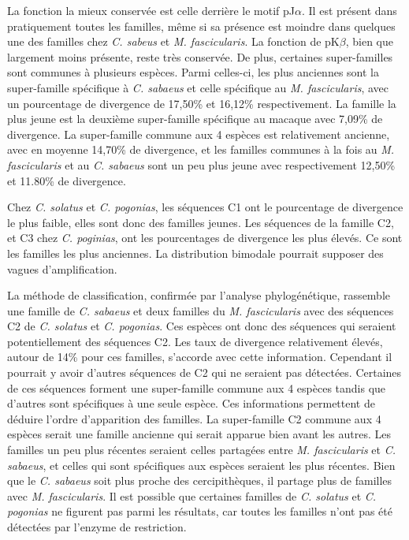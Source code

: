 \documentclass[12pt,a4paper]{article}
\begin{document}
	La fonction la mieux conservée est celle derrière le motif pJ$\alpha$. Il est présent dans pratiquement toutes les familles, même si sa présence est moindre dans quelques une des familles chez \textit{C. sabeus} et \textit{M. fascicularis}. La fonction de pK$\beta$, bien que largement moins présente, reste très conservée. De plus, certaines super-familles sont communes à plusieurs espèces. Parmi celles-ci, les plus anciennes sont la super-famille spécifique à \textit{C. sabaeus} et celle spécifique au \textit{M. fascicularis}, avec un pourcentage de divergence de 17,50\% et 16,12\% respectivement. La famille la plus jeune est la deuxième super-famille spécifique au macaque avec 7,09\% de divergence.  La super-famille commune aux 4 espèces est relativement ancienne, avec en moyenne 14,70\% de divergence, et les familles communes à la fois au \textit{M. fascicularis} et au \textit{C. sabaeus} sont un peu plus jeune avec respectivement 12,50\% et 11.80\% de divergence.

	Chez \textit{C. solatus} et \textit{C. pogonias}, les séquences C1 ont le pourcentage de divergence le plus faible, elles sont donc des familles jeunes. Les séquences de la famille C2, et C3 chez \textit{C. poginias}, ont les pourcentages de divergence les plus élevés. Ce sont les familles les plus anciennes.  La distribution bimodale pourrait supposer des vagues d'amplification.

	La méthode de classification, confirmée par l'analyse phylogénétique, rassemble une famille de \textit{C. sabaeus} et deux familles du \textit{M. fascicularis} avec des séquences C2 de \textit{C. solatus} et \textit{C. pogonias}. Ces espèces ont donc des séquences qui seraient potentiellement des séquences C2. Les taux de divergence relativement élevés, autour de 14\% pour ces familles, s'accorde avec cette information. Cependant il pourrait y avoir d'autres séquences de C2 qui ne seraient pas détectées. Certaines de ces séquences forment une super-famille commune aux 4 espèces tandis que d'autres sont spécifiques à une seule espèce. Ces informations permettent de déduire l'ordre d'apparition des familles. La super-famille C2 commune aux 4 espèces serait une famille ancienne qui serait apparue bien avant les autres. Les familles un peu plus récentes seraient celles partagées entre \textit{M. fascicularis} et \textit{C. sabaeus}, et celles qui sont spécifiques aux espèces seraient les plus récentes. Bien que le \textit{C. sabaeus} soit plus proche des cercipithèques, il partage plus de familles avec \textit{M. fascicularis}. Il est possible que certaines familles de \textit{C. solatus} et \textit{C. pogonias} ne figurent pas parmi les résultats, car toutes les familles n'ont pas été détectées par l'enzyme de restriction. 
\end{document}

